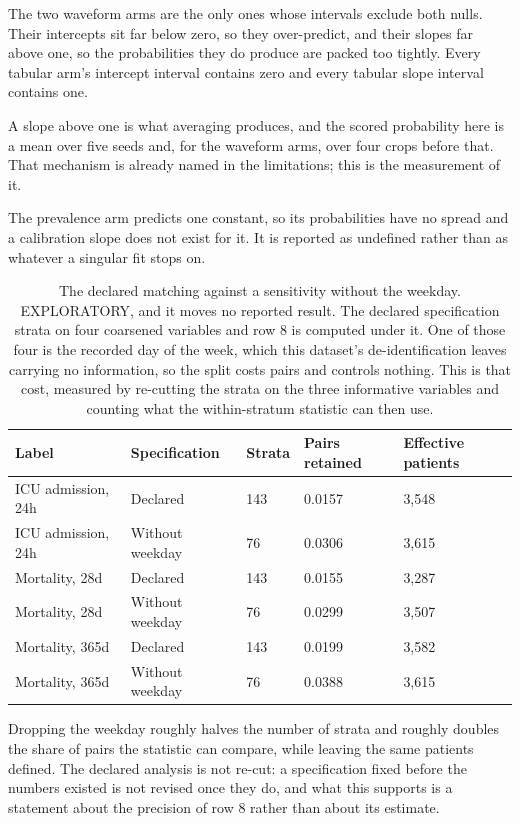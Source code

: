 \begin{table}[t]
\begin{tabular}{lllll}
\bottomrule
\end{tabular}
\par\footnotesize The two waveform arms are the only ones whose intervals exclude both nulls. Their intercepts sit far below zero, so they over-predict, and their slopes far above one, so the probabilities they do produce are packed too tightly. Every tabular arm's intercept interval contains zero and every tabular slope interval contains one.
\par\footnotesize A slope above one is what averaging produces, and the scored probability here is a mean over five seeds and, for the waveform arms, over four crops before that. That mechanism is already named in the limitations; this is the measurement of it.
\par\footnotesize The prevalence arm predicts one constant, so its probabilities have no spread and a calibration slope does not exist for it. It is reported as undefined rather than as whatever a singular fit stops on.
\end{table}

\begin{table}[t]
\centering
\small
\caption{The declared matching against a sensitivity without the weekday. EXPLORATORY, and it moves no reported result. The declared specification strata on four coarsened variables and row 8 is computed under it. One of those four is the recorded day of the week, which this dataset's de-identification leaves carrying no information, so the split costs pairs and controls nothing. This is that cost, measured by re-cutting the strata on the three informative variables and counting what the within-stratum statistic can then use.}
\label{tab:matching_sensitivity}
\begin{tabular}{lllll}
\toprule
Label & Specification & Strata & Pairs retained & Effective patients \\
\midrule
ICU admission, 24h & Declared & 143 & 0.0157 & 3,548 \\
ICU admission, 24h & Without weekday & 76 & 0.0306 & 3,615 \\
Mortality, 28d & Declared & 143 & 0.0155 & 3,287 \\
Mortality, 28d & Without weekday & 76 & 0.0299 & 3,507 \\
Mortality, 365d & Declared & 143 & 0.0199 & 3,582 \\
Mortality, 365d & Without weekday & 76 & 0.0388 & 3,615 \\
\bottomrule
\end{tabular}
\par\footnotesize Dropping the weekday roughly halves the number of strata and roughly doubles the share of pairs the statistic can compare, while leaving the same patients defined. The declared analysis is not re-cut: a specification fixed before the numbers existed is not revised once they do, and what this supports is a statement about the precision of row 8 rather than about its estimate.
\end{table}

